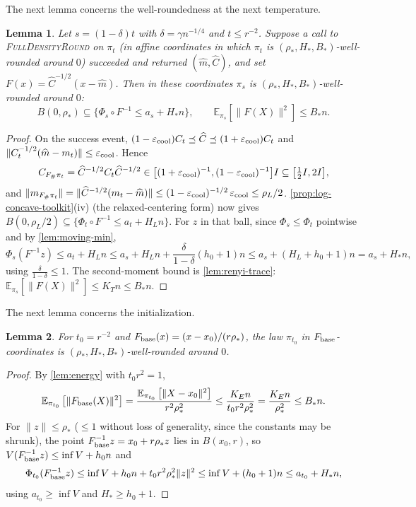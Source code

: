 \documentclass[11pt]{article}
\numberwithin{equation}{section}
\newtheorem{lemma}{Lemma}[section]
\theoremstyle{definition}
\newcommand{\eps}{\varepsilon}
\newcommand{\E}[2]{\mathbb{E}_{#1}\left[#2\right]}
\newcommand{\algname}[1]{\textnormal{\textsc{#1}}}
\begin{document}
The next lemma concerns the well-roundedness at the next temperature.

\begin{lemma}
\label{lem:next-temp}
Let $s=(1-\delta)t$ with
$\delta=\gamma n^{-1/4}$ and
$t\leq r^{-2}$.
Suppose a call to \algname{FullDensityRound} on $\pi_t$ (in affine coordinates
in which
$\pi_t$ is
$(\rho_*,H_*,B_*)$-well-rounded around
$0$) succeeded and returned
$(\widehat m,\widehat C)$, and set
$F(x)=\widehat C^{-1/2}(x-\widehat m)$.
Then in these coordinates $\pi_s$ is
$(\rho_*,H_*,B_*)$-well-rounded around
$0$:
\[
 B(0,\rho_*)\subseteq\{\Phi_s\circ F^{-1}\leq a_s+H_*n\},
 \qquad
 \E{\pi_s}{\|F(X)\|^2}\leq B_*n .
\]
\end{lemma}

\begin{proof}
On the success event,
$(1-\eps_{\rm cool})C_t\preceq\widehat C\preceq(1+\eps_{\rm cool})C_t$ and
$\|C_t^{-1/2}(\widehat m-m_t)\|\leq\eps_{\rm cool}$.
Hence
\[
 C_{F_\#\pi_t}
 =\widehat C^{-1/2}C_t\widehat C^{-1/2}
 \in\bigl[(1+\eps_{\rm cool})^{-1},(1-\eps_{\rm cool})^{-1}\bigr]I
 \subseteq\bigl[\tfrac12I,2I\bigr],
\]
and
$\|m_{F_\#\pi_t}\| =\|\widehat C^{-1/2}(m_t-\widehat m)\| \leq(1-\eps_{\rm cool})^{-1/2}\,\eps_{\rm cool} \leq\rho_L/2$.
\cref{prop:log-concave-toolkit}(iv) (the relaxed-centering form) now gives
$B(0,\rho_L/2)\subseteq\{\Phi_t\circ F^{-1}\leq a_t+H_Ln\}$.
For $z$ in that ball, since
$\Phi_s\leq\Phi_t$ pointwise and by \cref{lem:moving-min},
\[
\Phi_s(F^{-1}z)
\leq a_t+H_Ln
\leq a_s+H_Ln+\frac{\delta}{1-\delta}(h_0+1)n
\leq a_s+(H_L+h_0+1)n
=a_s+H_*n ,
\]
using $\frac{\delta}{1-\delta}\leq1$.
The second-moment bound is \cref{lem:renyi-trace}:
$\E{\pi_s}{\|F(X)\|^2}\leq K_Tn\leq B_*n$.
\end{proof}

The next lemma concerns the initialization.

\begin{lemma}
\label{lem:init}
For $t_0=r^{-2}$ and
$F_{\rm base}(x)=(x-x_0)/(r\rho_*)$, the law
$\pi_{t_0}$ in
$F_{\rm base}$-coordinates is
$(\rho_*,H_*,B_*)$-well-rounded around
$0$.
\end{lemma}

\begin{proof}
By \cref{lem:energy} with $t_0r^2=1$,
\[
\E{\pi_{t_0}}{\|F_{\rm base}(X)\|^2}
=\frac{\E{\pi_{t_0}}{\|X-x_0\|^2}}{r^2\rho_*^2}
\leq\frac{K_En}{t_0r^2\rho_*^2}
=\frac{K_En}{\rho_*^2}
\leq B_*n .
\]
For $\|z\|\leq\rho_*$
($\leq1$ without loss of generality, since the constants may be shrunk), the
point
$F_{\rm base}^{-1}z=x_0+r\rho_*z$ lies in
$B(x_0,r)$, so
$V(F_{\rm base}^{-1}z)\leq\inf V+h_0n$ and
\[
\Phi_{t_0}(F_{\rm base}^{-1}z)
\leq\inf V+h_0n+t_0r^2\rho_*^2\|z\|^2
\leq\inf V+(h_0+1)n
\leq a_{t_0}+H_*n ,
\]
using $a_{t_0}\geq\inf V$ and
$H_*\geq h_0+1$.
\end{proof}
\end{document}
